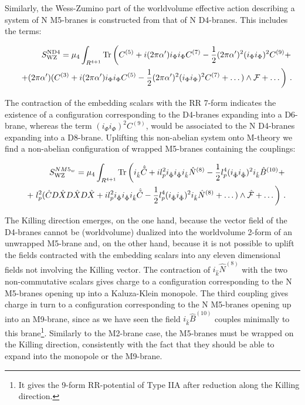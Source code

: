 \documentclass[12pt,a4paper]{article}
\begin{document}
Similarly, the Wess-Zumino part of the worldvolume effective action
describing a system of N M5-branes is constructed from that of
N D4-branes. This includes the terms:

\begin{eqnarray}
\label{actionND4}
&&S_{{\rm WZ}}^{{\rm N D4}}=\mu_4 \int_{R^{4+1}}{\rm Tr}
\left(C^{(5)}+i(2\pi\alpha^\prime)
i_\Phi i_\Phi C^{(7)}-\frac12 (2\pi\alpha^\prime)^2 (i_\Phi i_\Phi)^2
C^{(9)}+\right.\nonumber\\
&&\left. +(2\pi\alpha^\prime)(C^{(3)}+
i(2\pi\alpha^\prime)i_\Phi i_\Phi
C^{(5)}-\frac12 (2\pi\alpha^\prime)^2 (i_\Phi i_\Phi)^2 C^{(7)}+\dots)
\wedge {\cal F}+\dots\right)\, .
\end{eqnarray}

\noindent The contraction of the embedding scalars with the RR 7-form 
indicates the existence of a configuration corresponding to the D4-branes 
expanding into a D6-brane, whereas the
term $(i_\Phi i_\Phi)^2 C^{(9)}$, would be associated to the N D4-branes
expanding into a D8-brane. Uplifting this non-abelian system onto
M-theory we find a non-abelian configuration of wrapped M5-branes
containing the couplings:

\begin{eqnarray}
\label{actionNM5}
&&S^{N {M5}_w}_{\rm WZ}=\mu_4\int_{R^{4+1}}{\rm Tr}\left(i_{\hat k} 
{\hat {\tilde C}}+il_p^2 i_{\hat \Phi} i_{\hat \Phi} i_{\hat k} 
{\hat N}^{(8)}-\frac12 l_p^4
(i_{\hat \Phi} i_{\hat \Phi})^2 i_{\hat k}{\hat B}^{(10)}+
\right.\nonumber\\
&&+\left. l_p^2({\hat C}D{\hat X}D{\hat X}D{\hat X}+il_p^2
i_{\hat \Phi} i_{\hat \Phi} i_{\hat k}{\hat {\tilde C}}-\frac12 l_p^4
(i_{\hat \Phi} i_{\hat \Phi})^2 i_{\hat k}{\hat N}^{(8)}+\dots)\wedge
{\hat {\cal F}}+\dots\right)\, .
\end{eqnarray}

\noindent The Killing direction emerges, on the one hand,
because the vector field of the D4-branes cannot be (worldvolume)
dualized into the worldvolume 2-form of an unwrapped
M5-brane and, on the other
hand, because it is not possible to uplift the fields contracted with
the embedding scalars into any eleven dimensional fields not 
involving the Killing vector.
The contraction of $i_{\hat k}{\hat N}^{(8)}$ with the
two non-commutative scalars gives charge to a configuration
corresponding to the N M5-branes opening up into a Kaluza-Klein
monopole. The third coupling gives charge in turn to a configuration
corresponding to the N M5-branes opening up into an M9-brane, since
as we have seen the field $i_{\hat k}{\hat B}^{(10)}$ couples
minimally to this brane\footnote{It 
gives the 9-form RR-potential
of Type IIA after reduction along the Killing direction.}.
Similarly to the
M2-brane case, the M5-branes must be wrapped on the Killing 
direction, consistently with the fact that they should
be able to expand into the monopole or the M9-brane.
\end{document}
